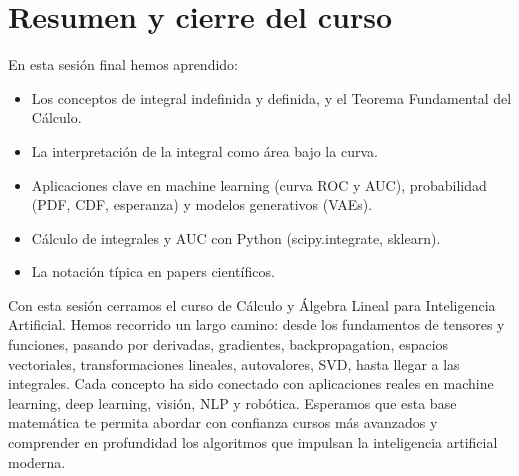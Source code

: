 \documentclass[12pt,a4paper,openany,oneside]{book}
\begin{document}
\section{Resumen y cierre del curso}

En esta sesión final hemos aprendido:
\begin{itemize}
    \item Los conceptos de integral indefinida y definida, y el Teorema Fundamental del Cálculo.
    \item La interpretación de la integral como área bajo la curva.
    \item Aplicaciones clave en machine learning (curva ROC y AUC), probabilidad (PDF, CDF, esperanza) y modelos generativos (VAEs).
    \item Cálculo de integrales y AUC con Python (scipy.integrate, sklearn).
    \item La notación típica en papers científicos.
\end{itemize}

Con esta sesión cerramos el curso de Cálculo y Álgebra Lineal para Inteligencia Artificial. Hemos recorrido un largo camino: desde los fundamentos de tensores y funciones, pasando por derivadas, gradientes, backpropagation, espacios vectoriales, transformaciones lineales, autovalores, SVD, hasta llegar a las integrales. Cada concepto ha sido conectado con aplicaciones reales en machine learning, deep learning, visión, NLP y robótica. Esperamos que esta base matemática te permita abordar con confianza cursos más avanzados y comprender en profundidad los algoritmos que impulsan la inteligencia artificial moderna.
\end{document}
